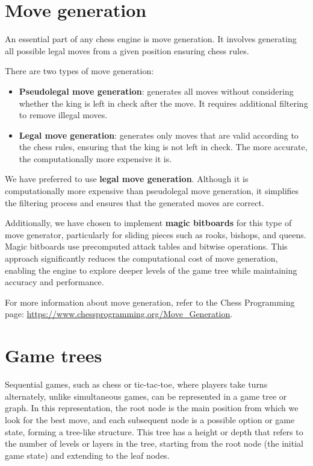\section{Move generation}

An essential part of any chess engine is move generation. It involves generating all possible legal moves from a given position ensuring chess rules.

\vspace{1em}

There are two types of move generation:

\begin{itemize}
    \item \textbf{Pseudolegal move generation}: generates all moves without considering whether the king is left in check after the move. It requires additional filtering to remove illegal moves.
    \item \textbf{Legal move generation}: generates only moves that are valid according to the chess rules, ensuring that the king is not left in check. The more accurate, the computationally more expensive it is.
\end{itemize}

We have preferred to use \textbf{legal move generation}. Although it is computationally more expensive than pseudolegal move generation, it simplifies the filtering process and ensures that the generated moves are correct.

Additionally, we have chosen to implement \textbf{magic bitboards} for this type of move generator, particularly for sliding pieces such as rooks, bishops, and queens. Magic bitboards use precomputed attack tables and bitwise operations. This approach significantly reduces the computational cost of move generation, enabling the engine to explore deeper levels of the game tree while maintaining accuracy and performance.

For more information about move generation, refer to the Chess Programming page: \url{https://www.chessprogramming.org/Move_Generation}.

\section{Game trees}

Sequential games, such as chess or tic-tac-toe, where players take turns alternately, unlike simultaneous games, can be represented in a game tree or graph. In this representation, the root node is the main position from which we look for the best move, and each subsequent node is a possible option or game state, forming a tree-like structure. This tree has a height or depth that refers to the number of levels or layers in the tree, starting from the root node (the initial game state) and extending to the leaf nodes.

